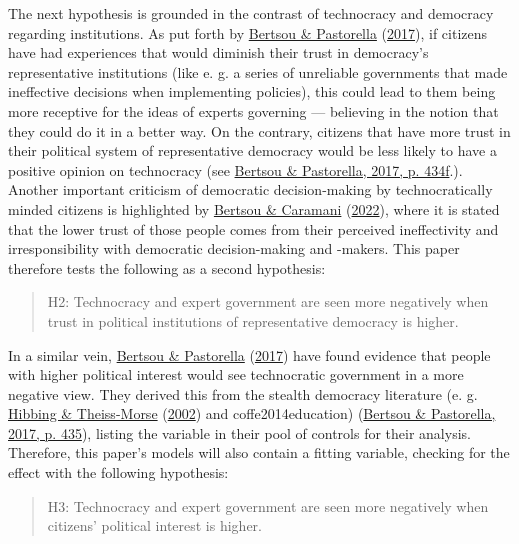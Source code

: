 \documentclass[
  12pt,
  english,
]{article}
\begin{document}
The next hypothesis is grounded in the contrast of technocracy and
democracy regarding institutions. As put forth by
\protect\hyperlink{ref-bertsou2017technocratic}{Bertsou \& Pastorella}
(\protect\hyperlink{ref-bertsou2017technocratic}{2017}), if citizens
have had experiences that would diminish their trust in democracy's
representative institutions (like e. g. a series of unreliable
governments that made ineffective decisions when implementing policies),
this could lead to them being more receptive for the ideas of experts
governing --- believing in the notion that they could do it in a better
way. On the contrary, citizens that have more trust in their political
system of representative democracy would be less likely to have a
positive opinion on technocracy (see
\protect\hyperlink{ref-bertsou2017technocratic}{Bertsou \& Pastorella,
2017, p. 434f}.). Another important criticism of democratic
decision-making by technocratically minded citizens is highlighted by
\protect\hyperlink{ref-bertsou2022people}{Bertsou \& Caramani}
(\protect\hyperlink{ref-bertsou2022people}{2022}), where it is stated
that the lower trust of those people comes from their perceived
ineffectivity and irresponsibility with democratic decision-making and
-makers. This paper therefore tests the following as a second
hypothesis:

\begin{quote}
H2: Technocracy and expert government are seen more negatively when
trust in political institutions of representative democracy is higher.
\end{quote}

In a similar vein,
\protect\hyperlink{ref-bertsou2017technocratic}{Bertsou \& Pastorella}
(\protect\hyperlink{ref-bertsou2017technocratic}{2017}) have found
evidence that people with higher political interest would see
technocratic government in a more negative view. They derived this from
the stealth democracy literature (e. g.
\protect\hyperlink{ref-hibbing2002stealth}{Hibbing \& Theiss-Morse}
(\protect\hyperlink{ref-hibbing2002stealth}{2002}) and
coffe2014education)
(\protect\hyperlink{ref-bertsou2017technocratic}{Bertsou \& Pastorella,
2017, p. 435}), listing the variable in their pool of controls for their
analysis. Therefore, this paper's models will also contain a fitting
variable, checking for the effect with the following hypothesis:

\begin{quote}
H3: Technocracy and expert government are seen more negatively when
citizens' political interest is higher.
\end{quote}
\end{document}
